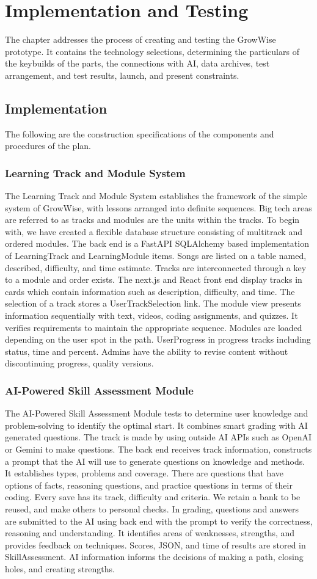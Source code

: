 \documentclass{FastFyp}
\begin{document}
\chapter{Implementation and Testing}
The chapter addresses the process of creating and testing the GrowWise prototype. It contains the technology selections, determining the particulars of the keybuilds of the parts, the connections with AI, data archives, test arrangement, and test results, launch, and present constraints.
\section{Implementation}
The following are the construction specifications of the components and procedures of the plan.
\subsection{Learning Track and Module System}
The Learning Track and Module System establishes the framework of the simple system of GrowWise, with lessons arranged into definite sequences. Big tech areas are referred to as tracks and modules are the units within the tracks.
To begin with, we have created a flexible database structure consisting of multitrack and ordered modules. The back end is a FastAPI SQLAlchemy based implementation of LearningTrack and LearningModule items. Songs are listed on a table named, described, difficulty, and time estimate. Tracks are interconnected through a key to a module and order exists.
The next.js and React front end display tracks in cards which contain information such as description, difficulty, and time. The selection of a track stores a UserTrackSelection link. The module view presents information sequentially with text, videos, coding assignments, and quizzes. It verifies requirements to maintain the appropriate sequence.
Modules are loaded depending on the user spot in the path. UserProgress in progress tracks including status, time and percent. Admins have the ability to revise content without discontinuing progress, quality versions.
\subsection{AI-Powered Skill Assessment Module}
The AI-Powered Skill Assessment Module tests to determine user knowledge and problem-solving to identify the optimal start. It combines smart grading with AI generated questions.
The track is made by using outside AI APIs such as OpenAI or Gemini to make questions. The back end receives track information, constructs a prompt that the AI will use to generate questions on knowledge and methods. It establishes types, problems and coverage.
There are questions that have options of facts, reasoning questions, and practice questions in terms of their coding. Every save has its track, difficulty and criteria. We retain a bank to be reused, and make others to personal checks.
In grading, questions and answers are submitted to the AI using back end with the prompt to verify the correctness, reasoning and understanding. It identifies areas of weaknesses, strengths, and provides feedback on techniques.
Scores, JSON, and time of results are stored in SkillAssessment. AI information informs the decisions of making a path, closing holes, and creating strengths.
\end{document}
